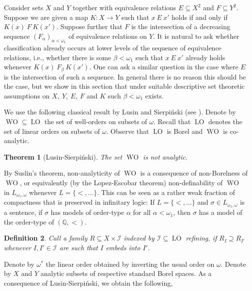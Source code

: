 \documentclass[12pt]{amsart}
\newtheorem{theorem}{Theorem}[section]
\newtheorem{definition}[theorem]{Definition}
\DeclareMathOperator{\WO}{WO}
\DeclareMathOperator{\LO}{LO}
\begin{document}
Consider sets $X$ and $Y$ together with
equivalence relations $E\subseteq X^2$ and $F\subseteq Y^2$. Suppose we are given a map $K \colon X\to Y$ such that $x \ E \ x'$ holds if and only if $K(x) \ F \ K(x')$. Suppose further that $F$ is the intersection of a decreasing sequence $(F_\alpha)_{\alpha<\omega_1}$ of equivalence relations on $Y$. It is natural to ask whether classification already occurs at lower levels of the sequence of equivalence relations, i.e., whether there is some $\beta<\omega_1$ such that $x \ E \ x'$ already holds whenever $K(x) \ F_\beta \ K(x')$. One can ask a similar question in the case where $E$ is the intersection of such a sequence.
In general there is no reason this should be the case, but we show in this section that under suitable descriptive set theoretic assumptions on $X,~Y,~E,~F$ and $K$ such $\beta<\omega_1$ exists.

We use the following classical result by Lusin and Sierpiński (see \cite[Theorem 27.12]{MR1321597}). Denote by $\WO\subseteq\LO$ the set of well-orders on subsets of $\omega$. Recall that $\LO$ denotes the set of linear orders on subsets of $\omega$. Observe that $\LO$ is Borel and $\WO$ is co-analytic.

\begin{theorem}[Lusin-Sierpiński]\label{thm:DST:not_sigma_one_one_well_orders}
    The set $\WO$ is not analytic. 
\end{theorem}

By Suslin's theorem, non-analyticity of $\WO$ is a consequence of non-Borelness of $\WO$, or equivalently (by the Lopez-Escobar theorem) non-definability of $\WO$ in $L_{\omega_1, \omega}$ whenever $L=\{<,\dots\}$. This can be seen as a rather weak fraction of compactness that is preserved in infinitary logic: If $L=\{<,\dots\}$ and $\sigma\in L_{\omega_1, \omega}$ is a sentence, if $\sigma$ has models of order-type $\alpha$ for all $\alpha<\omega_1$, then $\sigma$ has a model of the order-type of $(\mathbb Q,<)$.

\begin{definition}
    Call a family $R\subseteq X\times \mathcal{I}$ indexed by $\mathcal{I}\subseteq \LO$ \textit{refining}, if $R_I\supseteq R_{I'}$ whenever $I, I'\in \mathcal{I}$ are such that $I$ embeds into $I'$.
\end{definition}

Denote by $\omega^*$ the linear order obtained by inverting the usual order on $\omega$. Denote by $X$ and $Y$ analytic subsets of respective standard Borel spaces.
As a consequence of Lusin-Sierpiński, we obtain the following, 
\end{document}
